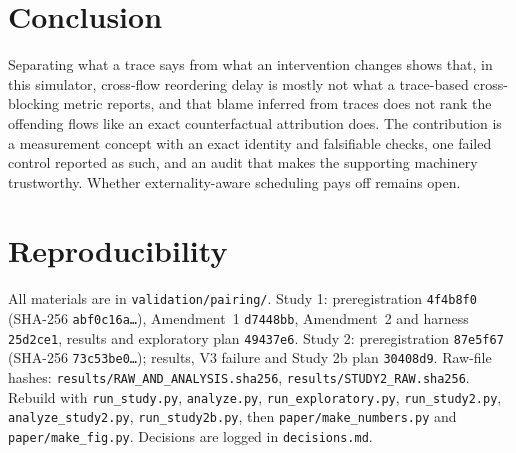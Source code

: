 \documentclass[11pt]{article}
\begin{document}
\section{Conclusion}
Separating what a trace says from what an intervention changes shows that, in this simulator, cross-flow reordering delay is mostly not what a trace-based cross-blocking metric reports, and that blame inferred from traces does not rank the offending flows like an exact counterfactual attribution does. The contribution is a measurement concept with an exact identity and falsifiable checks, one failed control reported as such, and an audit that makes the supporting machinery trustworthy. Whether externality-aware scheduling pays off remains open.

\section*{Reproducibility}\label{sec:repro}
All materials are in \texttt{validation/pairing/}. Study 1: preregistration \texttt{4f4b8f0} (SHA-256 \texttt{abf0c16a\dots}), Amendment~1 \texttt{d7448bb}, Amendment~2 and harness \texttt{25d2ce1}, results and exploratory plan \texttt{49437e6}. Study 2: preregistration \texttt{87e5f67} (SHA-256 \texttt{73c53be0\dots}); results, V3 failure and Study 2b plan \texttt{30408d9}. Raw-file hashes: \texttt{results/RAW\_AND\_ANALYSIS.sha256}, \texttt{results/STUDY2\_RAW.sha256}. Rebuild with \texttt{run\_study.py}, \texttt{analyze.py}, \texttt{run\_exploratory.py}, \texttt{run\_study2.py}, \texttt{analyze\_study2.py}, \texttt{run\_study2b.py}, then \texttt{paper/make\_numbers.py} and \texttt{paper/make\_fig.py}. Decisions are logged in \texttt{decisions.md}.



\end{document}
